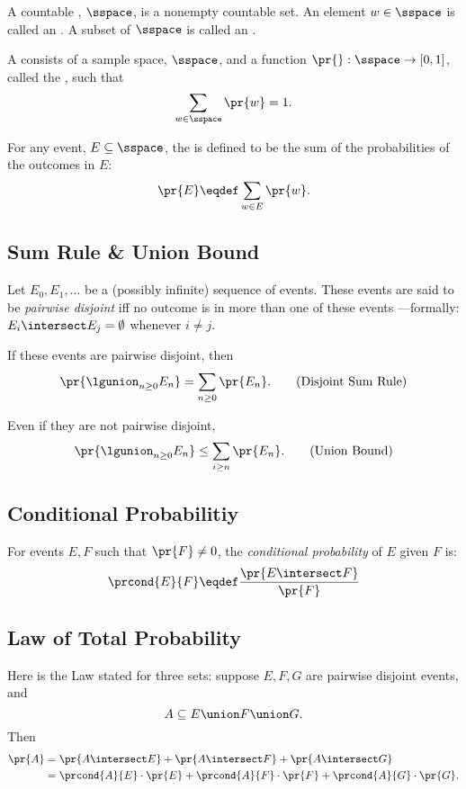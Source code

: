 \documentclass[handout]{mcs}
\begin{document}
{  A countable , $\sspace$, is a nonempty countable set.
  An element $w \in \sspace$ is called an .  A subset of
  $\sspace$ is called an .

  A  consists of a sample
  space, $\sspace$, and a function $\pr{}: \sspace\to [0,1]$, called
  the , such that
\[
\sum_{w \in \sspace} \pr{w} = 1.
\]

For any event, $E \subseteq \sspace$, the  is
defined to be the sum of the probabilities of the outcomes in $E$:
\[
\pr{E} \eqdef \sum_{w \in E} \pr{w}.
\]


\subsection{Sum Rule \& Union Bound}

Let $E_0,E_1,\dots$ be a (possibly infinite) sequence of events.  These
events are said to be \emph{pairwise disjoint} iff no outcome is in more
than one of these events ---formally: $E_i \intersect E_j = \emptyset$
whenever $i \neq j$.

If these events are pairwise disjoint, then
\begin{equation}
\pr{\lgunion_{n \geq 0} E_n} = \sum_{n \geq 0} \pr{E_n}.\tag{Disjoint Sum Rule}
\end{equation}

Even if they are not pairwise disjoint,
\begin{equation}
\pr{\lgunion_{n \geq 0} E_n} \leq \sum_{i \geq n} \pr{E_n}.\tag{Union Bound}
\end{equation}

\fi

\subsection*{Conditional Probabilitiy}
For events $E,F$ such that $\pr{F} \neq 0$, the \emph{conditional
    probability} of $E$ given $F$ is:
\[
\prcond{E}{F} \eqdef \frac{\pr{E \intersect F}}{\pr{F}}
\]

\subsection*{Law of Total Probability}

Here is the Law stated for three sets: suppose $E,F,G$ are pairwise
disjoint events, and
\[
A \subseteq E \union F \union G. 
\]
Then
\begin{align*}
\pr{A} & = \pr{A \intersect E}+ 
           \pr{A \intersect F}+ 
           \pr{A \intersect G}\\
 & = \prcond{A}{E} \cdot \pr{E} +
         \prcond{A}{F} \cdot \pr{F} +
         \prcond{A}{G} \cdot \pr{G}.
\end{align*}

}
\end{document}
